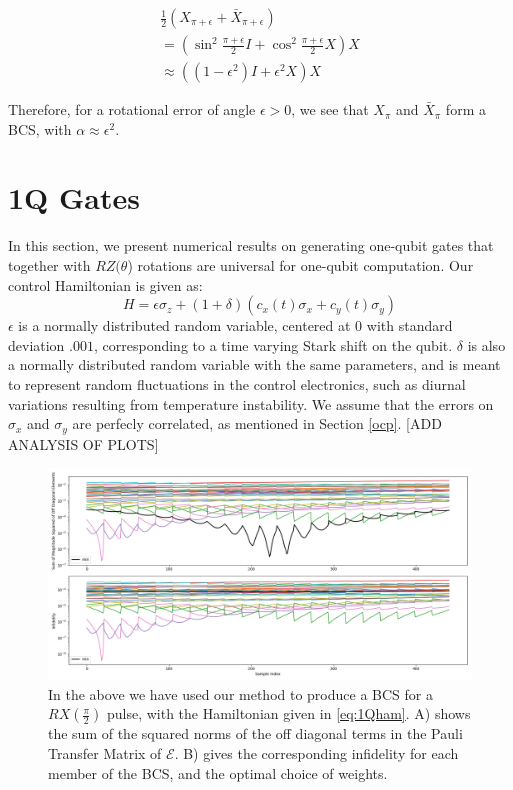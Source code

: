 \documentclass[aps,nofootinbib,pra,notitlepage,twocolumn]{revtex4-1}
\begin{document}
\begin{equation}
  \begin{gathered}
    \frac{1}{2}(X_{\pi + \epsilon} + \bar X_{\pi + \epsilon}) \\  
    = (\sin^2{\frac{\pi + \epsilon}{2}}I + \cos^2{\frac{\pi + \epsilon}{2}}X)X \\
    \approx ((1 - \epsilon^2)I + \epsilon^2X)X
  \end{gathered}
\end{equation}
 
Therefore, for a rotational error of angle $\epsilon > 0$, we see that $X_\pi$ and  $\bar X_\pi$  form a BCS, with $\alpha\approx\epsilon^2$.


\section{1Q Gates}\label{1Q Gates}
 In this section, we present numerical results on generating one-qubit gates that together with $RZ(\theta$) rotations are universal for one-qubit computation. Our control Hamiltonian is given as: 
\begin{equation}\label{eq:1Qham}
  H = \epsilon\sigma_z + (1 + \delta)(c_x(t)\sigma_x + c_y(t)\sigma_y)
\end{equation}
$\epsilon$ is a normally distributed random variable, centered at $0$ with standard deviation $.001$, corresponding to a time varying Stark shift on the qubit. $\delta$ is also a normally distributed random variable with the same parameters, and is meant to represent random fluctuations in the control electronics, such as diurnal variations resulting from temperature instability. We assume that the errors on $\sigma_x$ and $\sigma_y$ are perfecly correlated, as mentioned in Section \ref{ocp}.
[ADD ANALYSIS OF PLOTS]
\begin{figure}
\centering
\includegraphics[width=\textwidth]{x2.png}
\caption{In the above we have used our method to produce a BCS for a $RX(\frac{\pi}{2})$ pulse, with the Hamiltonian given in \ref{eq:1Qham}. A) shows the sum of the squared norms of the off diagonal terms in the Pauli Transfer Matrix of $\mathcal{E}$. B) gives the corresponding infidelity for each member of the BCS, and the optimal choice of weights.}
\end{figure}
\end{document}
